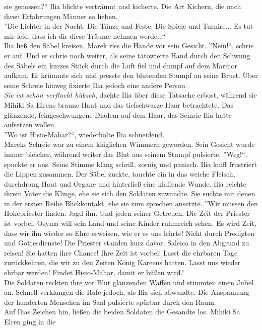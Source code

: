 sie genossen?`` Ilia blickte verträumt und kicherte. Die Art Kichern, die nach ihren Erfahrungen 
Männer so lieben.\\
''Die Lichter in der Nacht. Die Tänze und Feste. Die Spiele und Turnire... Es tut mir leid, dass 
ich dir diese Träume nehmen werde...``\\
Ilia ließ den Säbel kreisen. Marek riss die Hände vor sein Gesicht. ''Nein!``, schrie er auf. Und 
er schrie noch weiter, als seine tätowierte Hand durch den Schwung des Säbels ein kurzes Stück 
durch die Luft fiel und dumpf auf dem Marmor aufkam. Er krümmte sich und presste den blutenden 
Stumpf an seine Brust. Über seine Schreie hinweg fixierte Ilia jedoch eine andere Person.\\
\textit{Sie ist schon verflucht hübsch}, dachte Ilia über diese Tatsache erbost, während sie Mihiki 
Sa Elrens braune Haut und das tiefschwarze Haar betrachtete. Das glänzende, feingeschwungene Diadem 
auf dem Haar, das Semric Ilia hatte aufsetzen wollen.\\
''Wo ist Hisio-Mahar?``, wiederholte Ilia schneidend.\\
Mareks Schreie war zu einem kläglichen Wimmern geworden. Sein Gesicht wurde immer bleicher, 
während weiter das Blut aus seinem Stumpf pulsierte. ''Weg!``, spuckte er aus. Seine Stimme klang 
schrill, zornig und panisch. Ilia kniff frustriert die Lippen zusammen. Der Säbel zuckte, tauchte 
ein in das weiche Fleisch, durchdrang Haut und Organe und hinterließ eine klaffende Wunde. Ilia 
reichte ihrem Vater die Klinge, ehe sie sich den Soldaten zuwandte. Sie suchte mit denen in der 
ersten Reihe Blickkontakt, ehe sie zum sprechen ansetzte. ''Wir müssen den Hohepriester finden. 
Jagd ihn. Und jeden seiner Getreuen. Die Zeit der Priester ist vorbei. Osyma will sein Land und 
seine Kinder ruhmreich sehen. Es wird Zeit, dass wir ihn wieder so Ehre erweisen, wie er es uns 
lehrte! Nicht durch Predigten und Gottesdienste! Die Priester standen kurz davor, Saleica in den 
Abgrund zu reisen! Sie hatten ihre Chance! Ihre Zeit ist vorbei! Lasst die ehrbaren Tage 
zurückkehren, die wir zu den Zeiten König Kareens hatten. Lasst uns wieder ehrbar werden! Findet 
Hisio-Mahar, damit er büßen wird.``\\
Die Soldaten reckten ihre vor Blut glänzenden Waffen und stimmten einen Jubel an. Schnell 
verklangen die Rufe jedoch, als Ilia sich abwandte. Die Anspannung der hunderten Menschen im Saal 
pulsierte spürbar durch den Raum.\\
Auf Ilias Zeichen hin, ließen die beiden Soldaten die Gesandte los. Mihiki Sa Elren ging in die 
